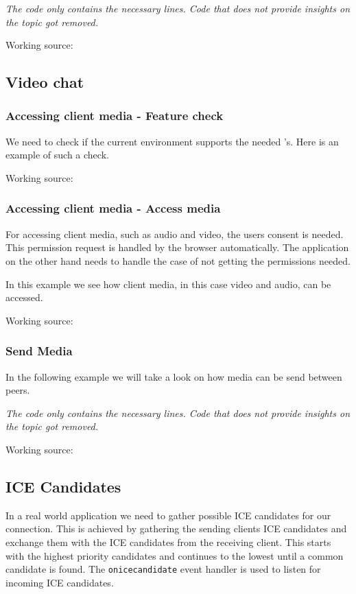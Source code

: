 \textit{The code only contains the necessary lines. Code that does not provide insights on the topic got removed.}

Working source:~\autocite{webrtc:senddata}

\subsection{Video chat}

\subsubsection{Accessing client media - Feature check}
We need to check if the current environment supports the needed 's. Here is an example of such a check.

Working source:~\autocite{media:featurecheck}

\subsubsection{Accessing client media - Access media}
For accessing client media, such as audio and video, the users consent is needed. This permission request is handled by the browser automatically. The application on the other hand needs to handle the case of not getting the permissions needed.

In this example we see how client media, in this case video and audio, can be accessed.

Working source:~\autocite{media:access}

\subsubsection{Send Media}
In the following example we will take a look on how media can be send between peers.

\textit{The code only contains the necessary lines. Code that does not provide insights on the topic got removed.}

Working source:~\autocite{webrtc:sendmedia}

\subsection{ICE Candidates}
In a real world application we need to gather possible ICE candidates for our connection. This is achieved by gathering the sending clients ICE candidates and exchange them with the ICE candidates from the receiving client. This starts with the highest priority candidates and continues to the lowest until a common candidate is found. The \lstinline[basicstyle=\ttfamily\color{black}]|onicecandidate| event handler is used to listen for incoming ICE candidates.